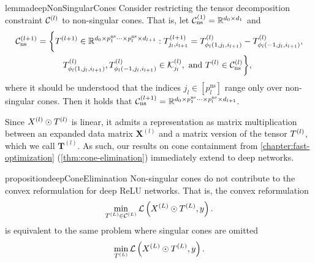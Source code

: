 \begin{restatable}{lemma}{deepNonSingularCones}\label{lemma:deep-non-singular-cones}
    Consider restricting the tensor decomposition constraint
    \( \mathcal{C}^{(l)} \) to non-singular cones.
    That is, let \( \mathcal{C}^{(1)}_{\text{ns}} = \mathbb{R}^{d_0 \times d_1} \)
    and
    \begin{equation}
        \begin{aligned}
            \mathcal{C}^{(l+1)}_{\text{ns}}
             & = \bigg\{
            T^{(l+1)} \in \mathbb{R}^{d_0 \times p^\text{ns}_1 \cdots \times p^\text{ns}_{l} \times d_{l+1}}
            :
            T^{(l+1)}_{j_{l}, i_{l+1}}
            = T^{(l)}_{ \phi_l(1, j_l, i_{l+1})}
            - T^{(l)}_{ \phi_l(-1, j_l, i_{l+1})}, \\
             & \hspace{3em}
            T^{(l)}_{\phi_l(1, j_l, i_{l+1})}, T^{(l)}_{ \phi_l(-1, j_l, i_{l+1})}
            \in \mathcal{K}^{(l)}_{j_{l}}, \text{ and }
            T^{(l)} \in \mathcal{C}_\text{ns}^{(l)}
            \bigg\},
        \end{aligned}
    \end{equation}
    where it should be understood that the indices
    \( j_l \in [p_l^\text{ns}] \) range only over non-singular cones.
    Then it holds that
    \( \mathcal{C}^{(l+1)}_{\text{ns}}
    = \mathbb{R}^{d_0 \times p^\text{ns}_1 \cdots \times p^\text{ns}_{l} \times d_{l+1}} \).
\end{restatable}

Since \( X^{(l)} \odot T^{(l)} \) is linear, it admits a representation
as matrix multiplication between an expanded data matrix \( \mathbf{X}^{(l)} \)
and a matrix version of the tensor \( T^{(l)} \), which we call \( \mathbf{T}^{(l)} \).
As such, our results on cone containment from \cref{chapter:fast-optimization}
(\cref{thm:cone-elimination}) immediately extend to deep networks.

\begin{restatable}{proposition}{deepConeElimination}\label{prop:deep-cone-elimination}
    Non-singular cones do not contribute to the convex reformulation for
    deep ReLU networks.
    That is, the convex reformulation
    \begin{equation*}
        \min_{T^{(L)} \in \mathcal{C}^{(L)}} \mathcal{L}\left(X^{(L)} \odot T^{(L)}, y\right).
    \end{equation*}
    is equivalent to the same problem where singular cones are omitted
    \begin{equation}\label{eq:non-singular-cone-problem}
        \min_{T^{(L)}} \mathcal{L}\left(X^{(L)} \odot T^{(L)}, y\right).
    \end{equation}
\end{restatable}

